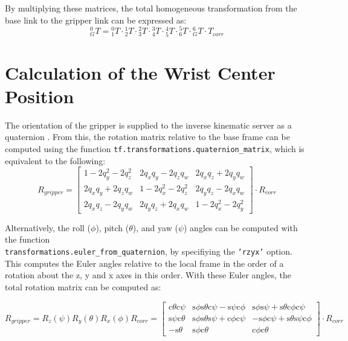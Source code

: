 \documentclass[twoside]{article}
\renewcommand{\c}{\text{c}}
\newcommand{\s}{\text{s}}
\newcommand{\T}[2]{\mbox{$_{#2}^{#1}{T}$}}
\newcommand{\code}[1]{\texttt{#1}}
\begin{document}
By multiplying these matrices, the total homogeneous transformation from the base link to
the gripper link can be expressed as:
\begin{equation}
  \T{0}{G} = \T{0}{1}\cdot\T{1}{2}\cdot\T{2}{3}\cdot\T{3}{4}\cdot\T{4}{5}\cdot\T{5}{6}\cdot\T{6}{G}\cdot T_{corr}
\end{equation}

\section{Calculation of the Wrist Center Position}
The orientation of the gripper is supplied to the inverse kinematic server as a quaternion \cite{quaternion}.
From this, the rotation matrix relative to the base frame can be computed using the function
\code{tf.transformations.quaternion\_matrix}\cite{tftransf81:online}, which is equivalent to the following:
\begin{equation}
  R_{gripper} =
  \begin{bmatrix}
    1 - 2 q_y^2 - 2 q_z^2	& 2 q_x q_y - 2 q_z q_w	& 2 q_x q_z + 2 q_y q_w \\
    2 q_x q_y + 2 q_z q_w	& 1 - 2 q_x^2 - 2 q_z^2	& 2 q_y q_z - 2 q_x q_w \\
    2 q_x q_z - 2 q_y q_w	& 2 q_y q_z + 2 q_x q_w	& 1 - 2 q_x^2 - 2 q_y^2
  \end{bmatrix}
  \cdot R_{corr}
\end{equation}

Alternatively, the roll ($\phi$), pitch ($\theta$), and yaw ($\psi$) angles can be computed with the function
\\ \code{transformations.euler\_from\_quaternion}\cite{tftransf81:online}, by specifiying the \code{'rzyx'} option.
This computes the Euler angles relative to the local frame in the order of a rotation about the
z, y and x axes in this order. With these Euler angles, the total rotation matrix can be computed as:

\begin{equation}
  R_{gripper} = R_z(\psi) R_y(\theta) R_x(\phi) R_{corr}
=
  \begin{bmatrix}
    \c\theta \c\psi& \s\phi \s\theta \c\psi - \s\psi \c\phi&  \s\phi \s\psi + \s\theta \c\phi \c\psi \\
    \s\psi \c\theta& \s\phi \s\theta \s\psi + \c\phi \c\psi& -\s\phi \c\psi + \s\theta \s\psi \c\phi \\
          -\s\theta&                        \s\phi \c\theta&                         \c\phi \c\theta
  \end{bmatrix}
  \cdot R_{corr}
\end{equation}
\end{document}

